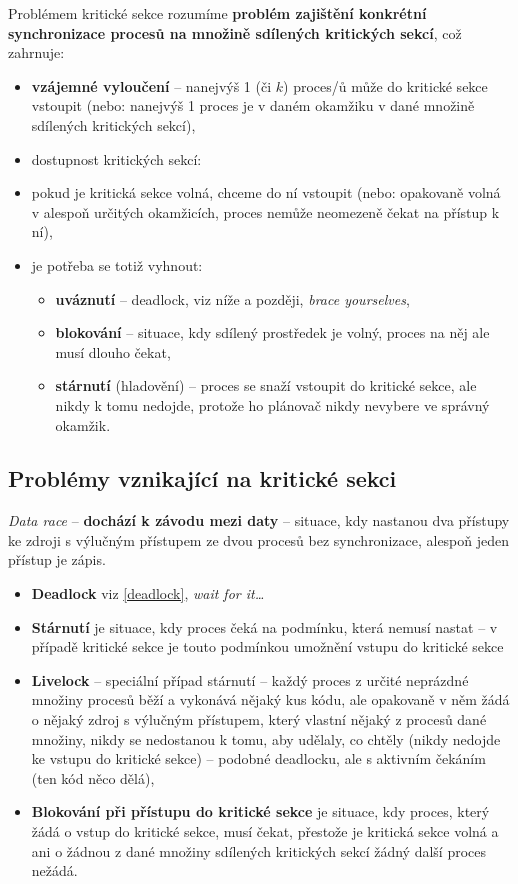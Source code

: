 \documentclass[a4paper, 11pt]{article}
\begin{document}
Problémem kritické sekce rozumíme \textbf{problém zajištění konkrétní synchronizace procesů na množině sdílených kritických sekcí}, což zahrnuje:
\begin{itemize}
    \item \textbf{vzájemné vyloučení} -- nanejvýš 1 (či $k$) proces/ů může do kritické sekce vstoupit (nebo: nanejvýš 1 proces je v daném okamžiku v dané množině sdílených kritických sekcí),
    \item dostupnost kritických sekcí:
    \item pokud je kritická sekce volná, chceme do ní vstoupit (nebo: opakovaně volná v alespoň určitých okamžicích, proces nemůže neomezeně čekat na přístup k ní),
    \item je potřeba se totiž vyhnout:
    \begin{itemize}
        \item \textbf{uváznutí} -- deadlock, viz níže a později, \textit{brace yourselves},
        \item \textbf{blokování} -- situace, kdy sdílený prostředek je volný, proces na něj ale musí dlouho čekat,
        \item \textbf{stárnutí} (hladovění) -- proces se snaží vstoupit do kritické sekce, ale nikdy k tomu nedojde, protože ho plánovač nikdy nevybere ve správný okamžik.
    \end{itemize}
\end{itemize}
 
\subsection{Problémy vznikající na kritické sekci}
\emph{Data race} -- \textbf{dochází k závodu mezi daty} -- situace, kdy nastanou dva přístupy ke zdroji s výlučným přístupem ze dvou procesů bez synchronizace, alespoň jeden přístup je zápis.

\begin{itemize}
	\item \textbf{Deadlock} viz \ref{deadlock}, \textit{wait for it\ldots}
    \item \textbf{Stárnutí} je situace, kdy proces čeká na podmínku, která nemusí nastat -- v případě kritické sekce je touto podmínkou umožnění vstupu do kritické sekce
    \item \textbf{Livelock} -- speciální případ stárnutí -- každý proces z určité neprázdné množiny procesů běží a vykonává nějaký kus kódu, ale opakovaně v něm žádá o nějaký zdroj s výlučným přístupem, který vlastní nějaký z procesů dané množiny, nikdy se nedostanou k tomu, aby udělaly, co chtěly (nikdy nedojde ke vstupu do kritické sekce) -- podobné deadlocku, ale s aktivním čekáním (ten kód něco dělá),
    
    \item \textbf{Blokování při přístupu do kritické sekce} je situace, kdy proces, který žádá o vstup do kritické sekce, musí čekat, přestože je kritická sekce volná a ani o žádnou z dané množiny sdílených kritických sekcí žádný další proces nežádá.
\end{itemize}
 
\end{document}
